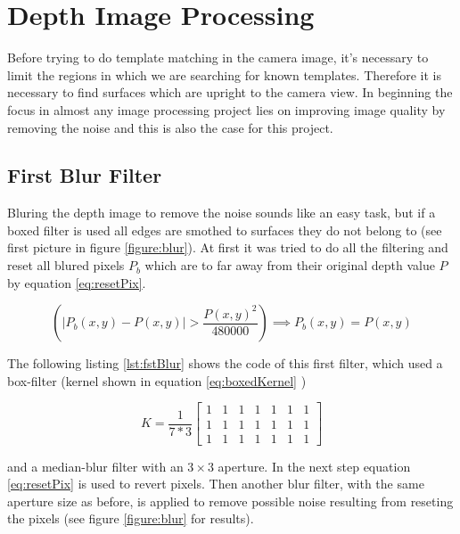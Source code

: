 \section{Depth Image Processing}
Before trying to do template matching in the camera image, it's necessary to limit the regions in which we are
searching for known templates. Therefore it is necessary to find surfaces which are upright to the camera view.
In beginning the focus in almost any image processing project lies on improving image quality by removing the 
noise and this is also the case for this project.

\subsection{First Blur Filter}
Bluring the depth image to remove the noise sounds like an easy task, but if a boxed filter is used 
all edges are smothed to surfaces they do not belong to (see first picture in figure \vref{figure:blur}).
At first it was tried to do all the filtering and reset all blured pixels $P_b$ which are to far away from their 
original depth value $P$ by equation \ref{eq:resetPix}.
 
\begin{equation}
   \left(\left|{P_b(x,y)-P(x,y)}\right|>{\frac{P(x,y)^2}{480000}}\right)\implies P_b(x,y)=P(x,y)
   \label{eq:resetPix}
\end{equation}

The following listing \vref{lst:fstBlur} shows the code of this first filter, which used a box-filter
(kernel shown in equation \vref{eq:boxedKernel} \cite{willowgarage:opencv:boxed})

\begin{equation}
	K=\frac{1}{7*3}
	\begin{bmatrix} 1 & 1 & 1 & 1 & 1 & 1 & 1\\ 
					1 & 1 & 1 & 1 & 1 & 1 & 1\\ 
					1 & 1 & 1 & 1 & 1 & 1 & 1 
	\end{bmatrix}
	\label{eq:boxedKernel}
\end{equation}

and a median-blur filter with an $3 \times 3$ aperture. In the next step equation \ref{eq:resetPix} is used 
to revert pixels. Then another blur filter, with the same aperture size as before, 
is applied to remove possible noise resulting from reseting the pixels (see figure \vref{figure:blur} for results).

